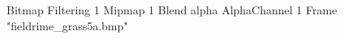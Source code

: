 {Bitmap
	{Filtering 1}
	{Mipmap 1}
	{Blend alpha}
	{AlphaChannel 1}
	{Frame "fieldrime_grass5a.bmp"}
}
